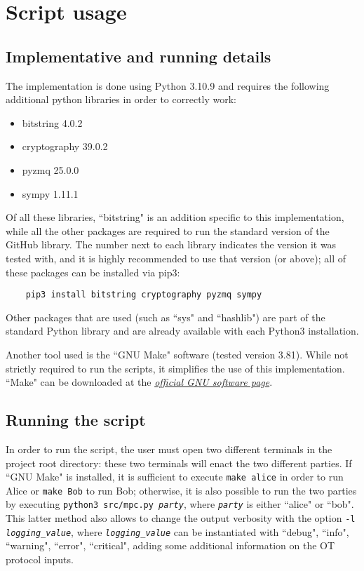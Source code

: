 \section{Script usage}

\subsection{Implementative and running details}

The implementation is done using Python 3.10.9 and requires the following additional python libraries in order to correctly work:

\begin{itemize}
    \item bitstring 4.0.2
    \item cryptography 39.0.2
    \item pyzmq 25.0.0
    \item sympy 1.11.1
\end{itemize}

Of all these libraries, ``bitstring" is  an addition specific to this implementation, while all the other packages are required to run the standard version of the GitHub library. The number next to each library indicates the version it was tested with, and it is highly recommended to use that version (or above); all of these packages can be installed via pip3:

\begin{lstlisting}
    pip3 install bitstring cryptography pyzmq sympy
\end{lstlisting}

Other packages that are used (such as ``sys" and ``hashlib") are part of the standard Python library and are already available with each Python3 installation.

Another tool used is the ``GNU Make" software (tested version 3.81). While not strictly required to run the scripts, it simplifies the use of this implementation. ``Make" can be downloaded at the \href{https://www.gnu.org/software/make/}{\textit{official GNU software page}}.

\subsection{Running the script}

In order to run the script, the user must open two different terminals in the project root directory: these two terminals will enact the two different parties. If ``GNU Make" is installed, it is sufficient to execute \texttt{make alice} in order to run Alice or \texttt{make Bob} to run Bob; otherwise, it is also possible to run the two parties by executing \texttt{python3 src/mpc.py \textit{party}}, where \texttt{\textit{party}} is either ``alice" or ``bob". This latter method also allows to change the output verbosity with the option \texttt{-l \textit{logging\_value}}, where \texttt{\textit{logging\_value}} can be instantiated with ``debug", ``info", ``warning", ``error", ``critical", adding some additional information on the OT protocol inputs.

